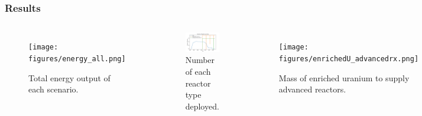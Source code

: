 \begin{frame}
\frametitle{Results}
        \vspace{-0.5cm}
    \begin{columns}
      \column[t]{6cm}
      \begin{figure}[t!]
          \texttt{[image: figures/energy\_all.png]}
            \vspace*{-0.5cm}
          \caption{Total energy output of each scenario.}
          \label{fig:energy}
      \end{figure}
            \vspace*{-0.25cm}
      \begin{figure}[h]
          \includegraphics[trim=0 8 0 10,clip,width=\linewidth]{figures/rx_deployment_all.png}
            \vspace*{-0.5cm}
          \caption{Number of each reactor type deployed.}
          \label{fig:ex_deployment}
      \end{figure}
      \column[t]{6cm}
  \begin{figure}[t]
      \texttt{[image: figures/enrichedU\_advancedrx.png]}
            \vspace*{-0.5cm}
      \caption{Mass of enriched uranium to supply advanced reactors.}
      \label{fig:enrichedU}
  \end{figure}
            \vspace*{-0.5cm}
  \begin{figure}[h]
      \includegraphics[trim=0 8 0 10,clip,width=\linewidth]{figures/swu_all.png}

\end{figure}
\end{columns}
\end{frame}
